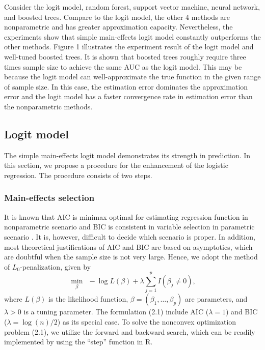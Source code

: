 \documentclass[12pt]{amsart}
\theoremstyle{definition}
\theoremstyle{remark}
\numberwithin{equation}{section}
\begin{document}
Consider the logit model, random forest, support vector machine, neural network, and boosted trees. Compare to the logit model, the other 4 methods are nonparametric and has greater approximation capacity. Nevertheless, the experiments show that simple main-effects logit model constantly outperforms the other methods. Figure 1 illustrates the experiment result of the logit model and well-tuned boosted trees. 
It is shown that boosted trees roughly require three times sample size to achieve the same AUC as the logit model. This may be because the logit model can well-approximate the true function in the given range of sample size. In this case, the estimation error dominates the approximation error and the logit model has a faster convergence rate in estimation error than the nonparametric methods. 


\subsection{Logit model}

The simple main-effects logit model demonstrates its strength in prediction. In this section, we propose a procedure for the enhancement of the logistic regression. The procedure consists of two steps. 

\subsubsection{Main-effects selection}

It is known that AIC is minimax optimal for estimating regression function in nonparametric scenario and BIC is consistent in variable selection in parametric scenario \cite{yang}. It is, however, difficult to decide which scenario is proper. In addition, most theoretical justifications of AIC and BIC are based on asymptotics, which are doubtful when the sample size is not very large. Hence, we adopt the method of $L_0$-penalization, given by
\begin{equation}
\min_{\beta}  \ \ - \log L(\beta) + \lambda \sum_{j=1}^p I(\beta_j \neq 0),
\end{equation}
where $L(\beta)$ is the likelihood function, $\beta = (\beta_1,\ldots,\beta_p)$ are parameters, and $\lambda>0$ is a tuning parameter. The formulation (2.1) include AIC ($\lambda = 1$) and BIC ($\lambda = \log(n)/2 $) as its special case. 
To solve the nonconvex optimization problem (2.1), we utilize the forward and backward search, which can be readily implemented by using the ``step'' function in R. 
\end{document}
